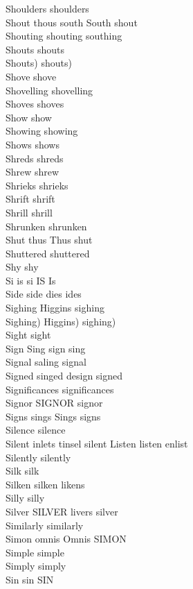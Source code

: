 Shoulders shoulders\\
Shout thous south South shout\\
Shouting shouting southing\\
Shouts shouts\\
Shouts) shouts)\\
Shove shove\\
Shovelling shovelling\\
Shoves shoves\\
Show show\\
Showing showing\\
Shows shows\\
Shreds shreds\\
Shrew shrew\\
Shrieks shrieks\\
Shrift shrift\\
Shrill shrill\\
Shrunken shrunken\\
Shut thus Thus shut\\
Shuttered shuttered\\
Shy shy\\
Si is si IS Is\\
Side side dies ides\\
Sighing Higgins sighing\\
Sighing) Higgins) sighing)\\
Sight sight\\
Sign Sing sign sing\\
Signal saling signal\\
Signed singed design signed\\
Significances significances\\
Signor SIGNOR signor\\
Signs sings Sings signs\\
Silence silence\\
Silent inlets tinsel silent Listen listen enlist\\
Silently silently\\
Silk silk\\
Silken silken likens\\
Silly silly\\
Silver SILVER livers silver\\
Similarly similarly\\
Simon omnis Omnis SIMON\\
Simple simple\\
Simply simply\\
Sin sin SIN\\
